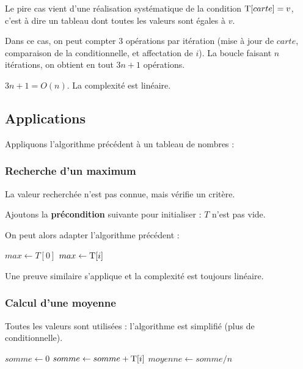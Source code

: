 \begin{itemize}
	Le pire cas vient d'une réalisation systématique de la condition $\text{\normalfont T}[carte]=v$, c'est à dire un tableau dont toutes les valeurs sont égales à $v$.
	
	Dans ce cas, on peut compter 3 opérations par itération (mise à jour de $carte$, comparaison de la conditionnelle, et affectation de $i$). La boucle faisant $n$ itérations, on obtient en tout $3n+1$ opérations.
	
	$3n+1 = O(n)$. La complexité est linéaire.
\end{itemize}

\subsection{Applications}

Appliquons l'algorithme précédent à un tableau de nombres :


\subsubsection{Recherche d'un maximum}

La valeur recherchée n'est pas connue, mais vérifie un critère. 

Ajoutons la {\bfseries précondition} suivante pour initialiser : $T$ n'est pas vide.

On peut alors adapter l'algorithme précédent :

\begin{algorithm}[H]
$max \leftarrow T[0]$\;
{ 
  {  $max \leftarrow \text{\normalfont T}[i]$\;  }
}
\end{algorithm}

Une preuve similaire s'applique et la complexité est toujours linéaire.


\subsubsection{Calcul d'une moyenne}

Toutes les valeurs sont utilisées : l'algorithme est simplifié (plus de conditionnelle).

\begin{algorithm}[H]
$somme \leftarrow 0$\;
{ $somme \leftarrow somme + \text{\normalfont T}[i]$\;  }
$moyenne \leftarrow somme / n$\;
\end{algorithm}

